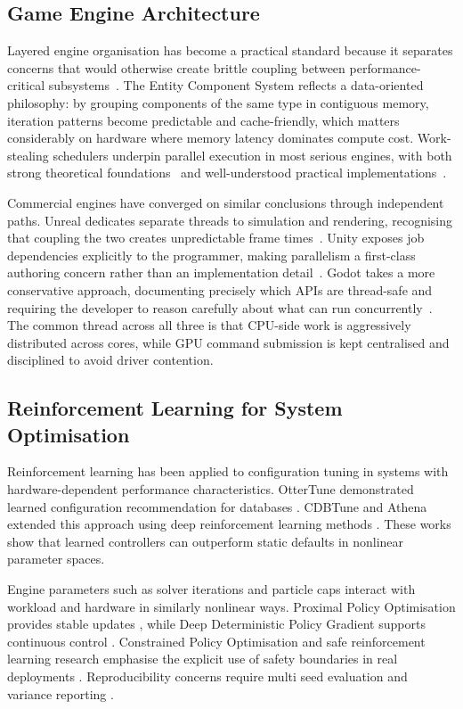 \documentclass[9pt,openany]{extbook}
\begin{document}
\subsection{Game Engine Architecture}
Layered engine organisation has become a practical standard because it separates concerns that would otherwise create brittle coupling between performance-critical subsystems~\cite{gregory2018}. The Entity Component System reflects a data-oriented philosophy: by grouping components of the same type in contiguous memory, iteration patterns become predictable and cache-friendly, which matters considerably on hardware where memory latency dominates compute cost. Work-stealing schedulers underpin parallel execution in most serious engines, with both strong theoretical foundations~\cite{arora1998} and well-understood practical implementations~\cite{chase_lev_2005}.

Commercial engines have converged on similar conclusions through independent paths. Unreal dedicates separate threads to simulation and rendering, recognising that coupling the two creates unpredictable frame times~\cite{ue_threaded_rendering, ue_parallel_rendering_overview}. Unity exposes job dependencies explicitly to the programmer, making parallelism a first-class authoring concern rather than an implementation detail~\cite{unity_job_dependencies, unity_jobhandle_complete}. Godot takes a more conservative approach, documenting precisely which APIs are thread-safe and requiring the developer to reason carefully about what can run concurrently~\cite{godot_thread_safe_apis}. The common thread across all three is that CPU-side work is aggressively distributed across cores, while GPU command submission is kept centralised and disciplined to avoid driver contention.
\subsection{Reinforcement Learning for System Optimisation}

Reinforcement learning has been applied to configuration tuning in systems with hardware-dependent performance characteristics. OtterTune demonstrated learned configuration recommendation for databases \cite{ottertune2017}. CDBTune and Athena extended this approach using deep reinforcement learning methods \cite{cdbtune2019, li2023athena}. These works show that learned controllers can outperform static defaults in nonlinear parameter spaces.

Engine parameters such as solver iterations and particle caps interact with workload and hardware in similarly nonlinear ways. Proximal Policy Optimisation provides stable updates \cite{ppo}, while Deep Deterministic Policy Gradient supports continuous control \cite{lillicrap2016ddpg}. Constrained Policy Optimisation and safe reinforcement learning research emphasise the explicit use of safety boundaries in real deployments \cite{cpo, safe_rl_survey}. Reproducibility concerns require multi seed evaluation and variance reporting \cite{henderson_rl_matters}.
\end{document}
